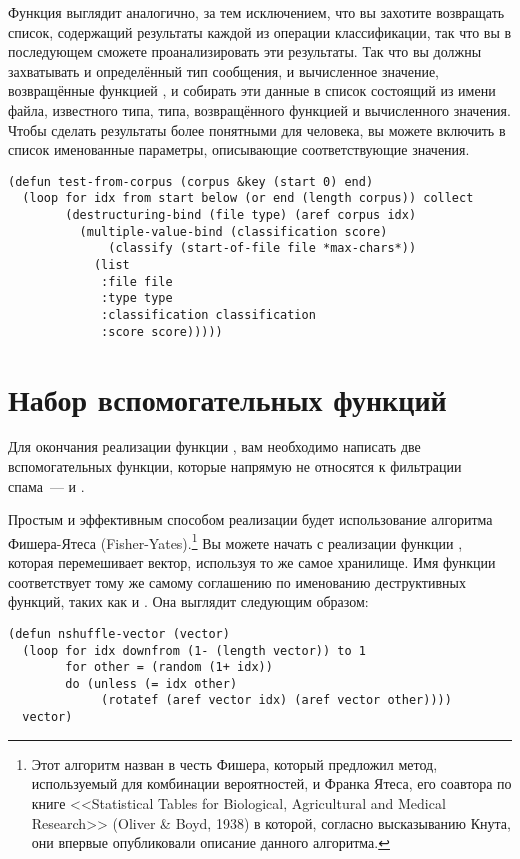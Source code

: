 Функция  выглядит аналогично, за тем исключением, что вы захотите
возвращать список, содержащий результаты каждой из операции классификации, так что вы в
последующем сможете проанализировать эти результаты.  Так что вы должны захватывать и
определённый тип сообщения, и вычисленное значение, возвращённые функцией ,
и собирать эти данные в список состоящий из имени файла, известного типа, типа,
возвращённого функцией  и вычисленного значения.  Чтобы сделать результаты
более понятными для человека, вы можете включить в список именованные параметры,
описывающие соответствующие значения.

\begin{lstlisting}
(defun test-from-corpus (corpus &key (start 0) end)
  (loop for idx from start below (or end (length corpus)) collect
        (destructuring-bind (file type) (aref corpus idx)
          (multiple-value-bind (classification score)
              (classify (start-of-file file *max-chars*))
            (list 
             :file file
             :type type
             :classification classification
             :score score)))))
\end{lstlisting}


\section{Набор вспомогательных функций}

Для окончания реализации функции , вам необходимо написать две
вспомогательных функции, которые напрямую не относятся к фильтрации спама~---
 и .

Простым и эффективным способом реализации  будет использование
алгоритма Фишера-Ятеса (Fisher-Yates).\footnote{Этот алгоритм назван в честь Фишера,
  который предложил метод, используемый для комбинации вероятностей, и Франка Ятеса, его
  соавтора по книге <<Statistical Tables for Biological, Agricultural and Medical
  Research>> (Oliver \& Boyd, 1938) в которой, согласно высказыванию Кнута, они впервые
  опубликовали описание данного алгоритма.}  Вы можете начать с реализации функции
  , которая перемешивает вектор, используя то же самое хранилище.
  Имя функции соответствует тому же самому соглашению по именованию деструктивных функций,
  таких как  и .  Она выглядит следующим образом:

\begin{lstlisting}
(defun nshuffle-vector (vector)
  (loop for idx downfrom (1- (length vector)) to 1
        for other = (random (1+ idx))
        do (unless (= idx other)
             (rotatef (aref vector idx) (aref vector other))))
  vector)
\end{lstlisting}

